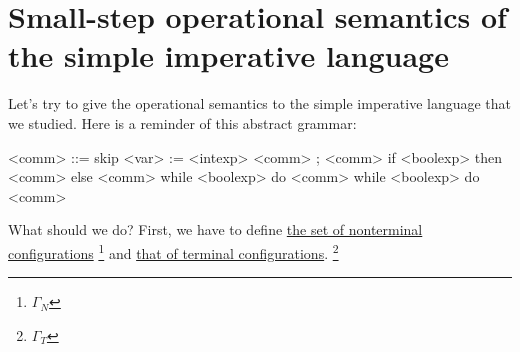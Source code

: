 \section{Small-step operational semantics of the simple imperative language}

\begin{enumcirc}
	\item
	Let's try to give the operational semantics to the simple imperative language
	that we studied.
	Here is a reminder of this abstract grammar:
	\begin{grammar}
		<comm> ::=
		skip
		 := <intexp>
		 ; <comm>
		\alt if <boolexp> then <comm> else <comm>
		\alt while <boolexp> do <comm>
		\alt while <boolexp> do <comm>
	\end{grammar}
	\item
	What should we do?
	First, we have to define
	\ul{the set of nonterminal configurations}
	\footnote{$\Gamma_N$}
	and
	\ul{that of terminal configurations}.
	\footnote{$\Gamma_T$}


\end{enumcirc}
